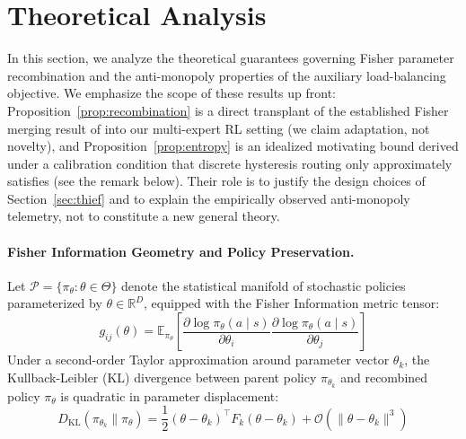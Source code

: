 \section{Theoretical Analysis}
\label{sec:theory}

In this section, we analyze the theoretical guarantees governing Fisher parameter recombination and the anti-monopoly properties of the auxiliary load-balancing objective. We emphasize the scope of these results up front: Proposition~\ref{prop:recombination} is a direct transplant of the established Fisher merging result of \citet{matena2021merging} into our multi-expert RL setting (we claim adaptation, not novelty), and Proposition~\ref{prop:entropy} is an idealized motivating bound derived under a calibration condition that discrete hysteresis routing only approximately satisfies (see the remark below). Their role is to justify the design choices of Section~\ref{sec:thief} and to explain the empirically observed anti-monopoly telemetry, not to constitute a new general theory.

\paragraph{Fisher Information Geometry and Policy Preservation.}
Let $\mathcal{P} = \{\pi_\theta : \theta \in \Theta\}$ denote the statistical manifold of stochastic policies parameterized by $\theta \in \mathbb{R}^D$, equipped with the Fisher Information metric tensor:
\begin{equation}
g_{ij}(\theta) = \mathbb{E}_{\pi_\theta} \left[\frac{\partial \log \pi_\theta(a \mid s)}{\partial \theta_i} \frac{\partial \log \pi_\theta(a \mid s)}{\partial \theta_j}\right]
\end{equation}
Under a second-order Taylor approximation around parameter vector $\theta_k$, the Kullback-Leibler (KL) divergence between parent policy $\pi_{\theta_k}$ and recombined policy $\pi_\theta$ is quadratic in parameter displacement:
\begin{equation}
D_{\text{KL}}(\pi_{\theta_k} \parallel \pi_\theta) = \frac{1}{2} (\theta - \theta_k)^\top F_k (\theta - \theta_k) + \mathcal{O}(\|\theta - \theta_k\|^3)
\end{equation}

